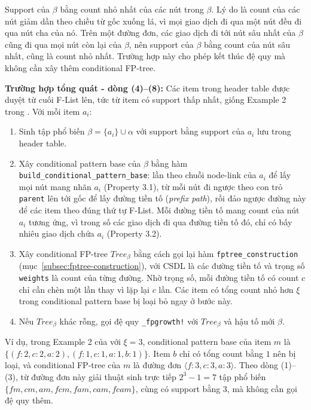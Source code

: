 \documentclass[conference]{IEEEtran}
\begin{document}
Support của $\beta$ bằng count nhỏ nhất của các nút trong $\beta$. Lý do là count của các nút giảm dần theo chiều từ gốc xuống lá, vì mọi giao dịch đi qua một nút đều đi qua nút cha của nó. Trên một đường đơn, các giao dịch đi tới nút sâu nhất của $\beta$ cũng đi qua mọi nút còn lại của $\beta$, nên support của $\beta$ bằng count của nút sâu nhất, cũng là count nhỏ nhất. Trường hợp này cho phép kết thúc đệ quy mà không cần xây thêm conditional FP-tree.

\textbf{Trường hợp tổng quát - dòng (4)--(8):}
Các item trong header table được duyệt từ cuối F-List lên, tức từ item có support thấp nhất, giống Example 2 trong \cite{han2000mining}. Với mỗi item $a_i$:
\begin{enumerate}
    \item Sinh tập phổ biến $\beta = \{a_i\} \cup \alpha$ với support bằng support của $a_i$ lưu trong header table.
    \item Xây conditional pattern base của $\beta$ bằng hàm \texttt{build\_conditional\_pattern\_base}: lần theo chuỗi node-link của $a_i$ để lấy mọi nút mang nhãn $a_i$ (Property 3.1), từ mỗi nút đi ngược theo con trỏ \texttt{parent} lên tới gốc để lấy đường tiền tố (\textit{prefix path}), rồi đảo ngược đường này để các item theo đúng thứ tự F-List. Mỗi đường tiền tố mang count của nút $a_i$ tương ứng, vì trong số các giao dịch đi qua đường tiền tố đó, chỉ có bấy nhiêu giao dịch chứa $a_i$ (Property 3.2).
    \item Xây conditional FP-tree $Tree_\beta$ bằng cách gọi lại hàm \texttt{fptree\_construction} (mục~\ref{subsec:fptree-construction}), với CSDL là các đường tiền tố và trọng số \texttt{weights} là count của từng đường. Nhờ trọng số, mỗi đường tiền tố có count $c$ chỉ cần chèn một lần thay vì lặp lại $c$ lần. Các item có tổng count nhỏ hơn $\xi$ trong conditional pattern base bị loại bỏ ngay ở bước này.
    \item Nếu $Tree_\beta$ khác rỗng, gọi đệ quy \texttt{\_fpgrowth!} với $Tree_\beta$ và hậu tố mới $\beta$.
\end{enumerate}

Ví dụ, trong Example 2 của \cite{han2000mining} với $\xi = 3$, conditional pattern base của item $m$ là $\{(f\!:\!2, c\!:\!2, a\!:\!2), (f\!:\!1, c\!:\!1, a\!:\!1, b\!:\!1)\}$. Item $b$ chỉ có tổng count bằng $1$ nên bị loại, và conditional FP-tree của $m$ là đường đơn $\langle f\!:\!3, c\!:\!3, a\!:\!3 \rangle$. Theo dòng (1)--(3), từ đường đơn này giải thuật sinh trực tiếp $2^3 - 1 = 7$ tập phổ biến $\{fm, cm, am, fcm, fam, cam, fcam\}$, cùng có support bằng $3$, mà không cần gọi đệ quy thêm.
\end{document}
